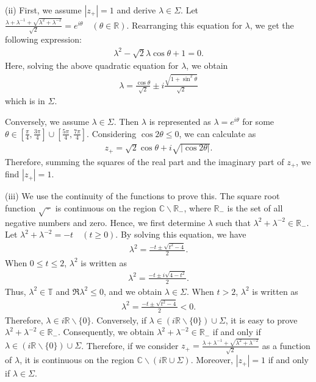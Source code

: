 \documentclass[a4paper,12pt]{article}
\theoremstyle{plain}
\theoremstyle{definition}
\theoremstyle{definition}
\begin{document}
($\mathrm{ii}$) First, we assume $|z_+|=1$ and derive $\lambda \in \Sigma$. Let $\frac{\lambda +\lambda ^{-1} +\sqrt{\lambda ^2 +\lambda ^{-2}}}{\sqrt{2}}=e^{i\theta} \quad (\theta\in \mathbb{R})$. Rearranging this equation for $\lambda$, we get the following expression:
\begin{align*}
    \lambda^2 -\sqrt{2}\lambda \cos \theta +1=0.
\end{align*}
Here, solving the above quadratic equation for $\lambda$, we obtain 
\begin{align*}
    \lambda = \frac{\cos \theta}{\sqrt{2}}\pm i\frac{\sqrt{1+\sin ^2 \theta}}{\sqrt{2}}
\end{align*}
which is in $\Sigma$.

Conversely, we assume $\lambda \in \Sigma$. Then $\lambda$ is represented as $\lambda = e^{i \theta}$ for some $\theta \in \left[\frac{\pi}{4}, \frac{3\pi}{4} \right] \cup \left[\frac{5\pi}{4}, \frac{7\pi}{4} \right]$. Considering $\cos 2\theta \leq 0$, we can calculate as
\begin{align*}
    z_+=\sqrt{2}\cos \theta +i\sqrt{|\cos 2\theta|}.
\end{align*}
Therefore, summing the squares of the real part and the imaginary part of $z_+$, we find $|z_{+}|=1$.

($\mathrm{iii}$) We use the continuity of the functions to prove this. The square root function $\sqrt{\, \cdot\,}$ is continuous on the region $\mathbb{C} \backslash \mathbb{R}_-$, where $\mathbb{R}_-$ is the set of all negative numbers and zero. Hence, we first determine $\lambda$ such that $\lambda^2 +\lambda^{-2} \in \mathbb{R}_-$. Let $\lambda^2 +\lambda^{-2}=-t \quad (t \geq 0)$. By solving this equation, we have
\begin{align*}
    \lambda ^2 = \frac{-t\pm \sqrt{t^2 -4}}{2}.
\end{align*}
When $0 \leq t\leq 2$, $\lambda^2$ is written as
\begin{align*}
    \lambda^2 =\frac{-t\pm i\sqrt{4-t^2}}{2}.
\end{align*}
Thus, $\lambda^2 \in \mathbb{T}$ and $\Re \lambda ^2 \leq 0$, and we obtain $\lambda \in \Sigma$.
When $t>2$, $\lambda^2$ is written as
\begin{align*}
    \lambda^2 = \frac{-t\pm \sqrt{t^2-4}}{2}<0.
\end{align*}
Therefore, $\lambda \in i \mathbb{R}\backslash \{0 \}$.
Conversely, if $\lambda \in (i\mathbb{R} \backslash \{ 0 \}) \cup \Sigma$, it is easy to prove $\lambda^2 +\lambda^{-2}\in \mathbb{R}_-$.
Consequently, we obtain $\lambda^2 +\lambda^{-2} \in \mathbb{R}_-$ if and only if $\lambda \in (i\mathbb{R} \backslash \{ 0 \}) \cup \Sigma$.
Therefore, if we consider $z_+ = \frac{\lambda+\lambda^{-1} + \sqrt{\lambda^2 + \lambda^{-2}}}{\sqrt{2}}$ as a function of $\lambda$, it is continuous on the region $\mathbb{C}\backslash (i\mathbb{R} \cup \Sigma)$. Moreover, $|z_+|=1$ if and only if $\lambda \in \Sigma$.
\end{document}
